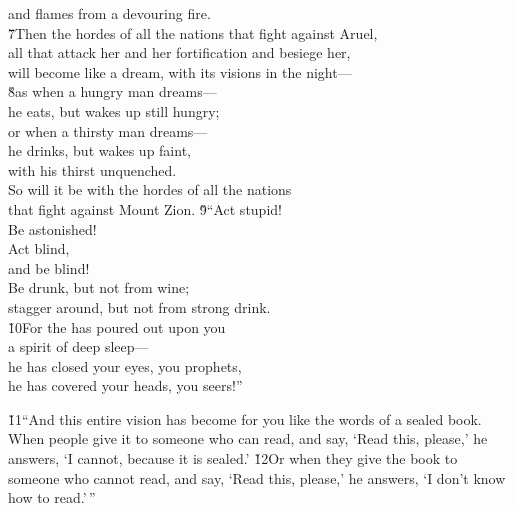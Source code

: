 \begin{poetry}
\poemlll       and flames from a devouring fire. \\
\poeml \v{7}Then the hordes of all the nations that fight against Aruel, \\
\poemll    all that attack her and her fortification and besiege her, \\
\poemlll       will become like a dream, with its visions in the night--- \\
\poeml \v{8}as when a hungry man dreams--- \\
\poemll    he eats, but wakes up still hungry; \\
\poeml or when a thirsty man dreams--- \\
\poemll    he drinks, but wakes up faint, \\
\poemlll       with his thirst unquenched. \\
\poeml So will it be with the hordes of all the nations \\
\poemll    that fight against Mount Zion.
\poeml \v{9}``Act stupid! \\
\poemll    Be astonished! \\
\poeml Act blind, \\
\poemll    and be blind! \\
\poeml Be drunk, but not from wine; \\
\poemll    stagger around, but not from strong drink. \\
\poeml \v{10}For the  has poured out upon you \\
\poemll    a spirit of deep sleep--- \\
\poeml he has closed your eyes, you prophets, \\
\poemll    he has covered your heads, you seers!''
\end{poetry}

\v{11}``And this entire vision has become for you like the words of a sealed book. When people give it to someone who can read, and say, `Read this, please,' he answers, `I cannot, because it is sealed.' \v{12}Or when they give the book to someone who cannot read, and say, `Read this, please,' he answers, `I don't know how to read.'\,''

